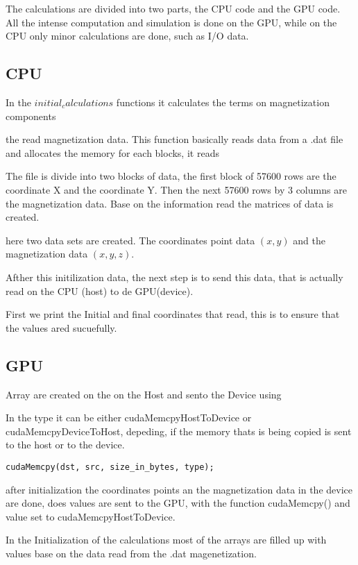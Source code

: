 The calculations are divided into two parts, the CPU code and the GPU code. All the intense computation and simulation is done on the GPU, while on the CPU only minor calculations are done, such as I/O  data.

\subsection{CPU}
In the $initial_calculations$ functions it calculates the terms on magnetization components


the read magnetization data.
This function basically reads data from a .dat file and allocates the memory for each blocks, it reads

The file is divide into two blocks of data, the first block of 57600 rows are the coordinate X and the coordinate Y. Then the next 57600 rows by 3 columns are the magnetization data. Base on the information read the matrices of data is created.

here two data sets are created. The coordinates point data $(x,y)$ and the magnetization data $(x, y, z)$.

Afther this initilization data, the next step is to send this data, that is actually read on the CPU (host) to de GPU(device).


First we print the Initial and final coordinates that read, this is to ensure that the values ared sucuefully.


\subsection{GPU}


Array are created on the on the Host and sento the Device using

In the type it can be either cudaMemcpyHostToDevice or cudaMemcpyDeviceToHost, depeding, if the memory thats is being copied is sent to the host or to the device.

\begin{lstlisting}[frame=none]
cudaMemcpy(dst, src, size_in_bytes, type);
\end{lstlisting}

after initialization the coordinates points an the magnetization data in the device are done, does values are sent to the GPU, with the function cudaMemcpy() and value set to cudaMemcpyHostToDevice.

In the Initialization of the calculations most of the arrays are filled up with values base on the data read from the .dat magenetization.


